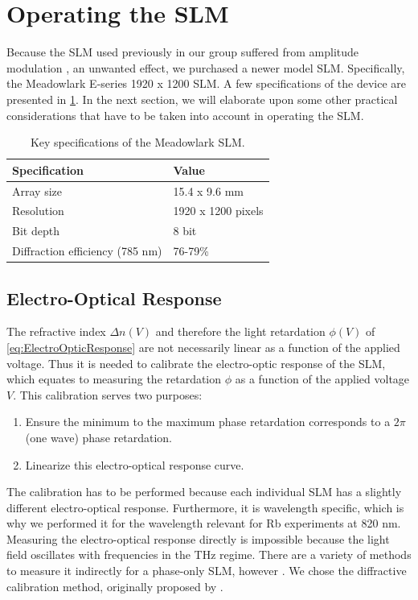 \section{Operating the SLM}\label{sec:SLMoperatoin}

Because the SLM used previously in our group suffered from amplitude modulation \cite{Bijnen2015,Dijk2012}, an unwanted effect, we purchased a newer model SLM. Specifically, the Meadowlark E-series 1920 x 1200 SLM.
A few specifications of the device are presented in \cref{table:SLMspecs}.
In the next section, we will elaborate upon some other practical considerations that have to be taken into account in operating the SLM.

\begin{table}[h]
    \centering
    \caption{Key specifications of the Meadowlark SLM.}
    \label{table:SLMspecs}
    \begin{tabular}{l | l}
        \textbf{Specification}              & \textbf{Value}        \\ \hline 
        Array size                          & 15.4 x 9.6 mm         \\ \hline
        Resolution                          & 1920 x 1200 pixels    \\ \hline
        Bit depth                           & 8 bit                 \\ \hline
        Diffraction efficiency (785 nm)  & 76-79\%   
    \end{tabular}
\end{table}


\subsection{Electro-Optical Response}

The refractive index $\Delta n(V)$ and therefore the light retardation $\phi(V)$ of \cref{eq:ElectroOpticResponse} are not necessarily linear as a function of the applied voltage.
Thus it is needed to calibrate the electro-optic response of the \ac{SLM}, which equates to measuring the retardation $\phi$ as a function of the applied voltage $V$. 
This calibration serves two purposes:

\begin{enumerate}
    \itemsep=0pt
    
    \item Ensure the minimum to the maximum phase retardation corresponds to a $2\pi$ (one wave) phase retardation.
    
    \item Linearize this electro-optical response curve. 
\end{enumerate}
The calibration has to be performed because each individual SLM has a slightly different electro-optical response. 
Furthermore, it is wavelength specific, which is why we performed it for the wavelength relevant for Rb experiments at 820 nm. 
Measuring the electro-optical response directly is impossible because the light field oscillates with frequencies in the THz regime.
There are a variety of methods to measure it indirectly for a phase-only \ac{SLM}, however \cite{Li2019}.
We chose the diffractive calibration method, originally proposed by \cite{Zhang1994}.

